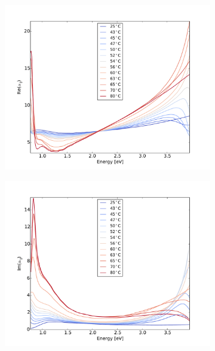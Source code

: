 %
%
\begin{figure}
    \centering
    \begin{subfigure}[b]{0.49\textwidth}
        \centering
        \includegraphics[width=\textwidth]{Results/Sim1/re_alpha_parallel.pdf}
        \caption{}
        \label{fig:2}
    \end{subfigure}
    \begin{subfigure}[b]{0.49\textwidth}
        \centering
        \includegraphics[width=\textwidth]{Results/Sim1/im_alpha_parallel.pdf}
        \caption{}
        \label{fig:2}
    \end{subfigure}

\end{figure}
